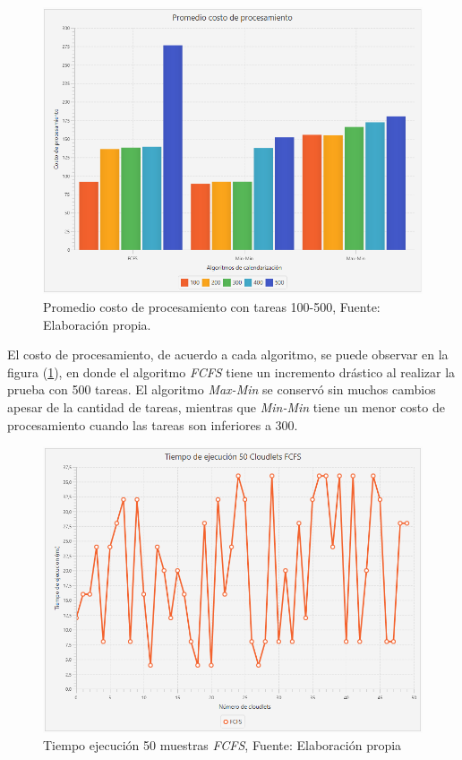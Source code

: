 \newpage
\setcounter{figure}{15}
\renewcommand\thefigure{\arabic{figure}}
\begin{figure}[h!] 
	\centering
	\includegraphics[scale=0.5]{media/costoproce}
	\caption{Promedio costo de procesamiento con tareas 100-500, Fuente: Elaboraci\'on propia.}
	\label{fig:costo}
\end{figure}


El costo de procesamiento, de acuerdo a cada algoritmo, se puede observar en la figura (\ref{fig:costo}), en donde el algoritmo \textit{FCFS} tiene un incremento dr\'astico al realizar la prueba con 500 tareas. El algoritmo \textit{Max-Min} se conserv\'o sin muchos cambios apesar de la cantidad de tareas, mientras que \textit{Min-Min} tiene un menor costo de procesamiento cuando las tareas son inferiores a 300.

\newpage

\setcounter{figure}{16}
\renewcommand\thefigure{\arabic{figure}}
\begin{figure}[h!] 
	\centering
	\includegraphics[scale=0.5]{media/fcfs}
	\caption{Tiempo ejecuci\'on 50 muestras \textit{FCFS}, Fuente: Elaboraci\'on propia}
	\label{fig:ejecucion}
\end{figure}


